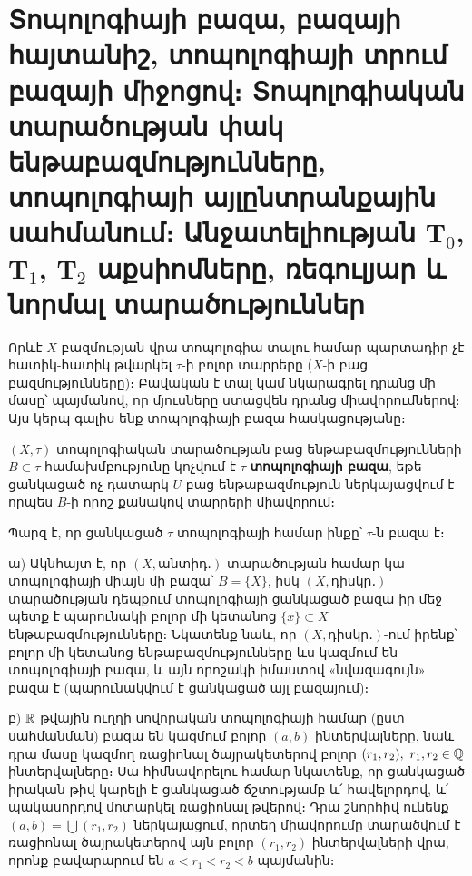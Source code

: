 \documentclass[./main.tex]{subfiles}
\begin{document}
\onehalfspacing
\section{Տոպո\-լոգիայի բազա, բազայի հայտանիշ, տոպո\-լո\-գիա\-յի տրում բազայի միջո\-ցով։ Տոպո\-լո\-գիա\-կան տարա\-ծու\-թյան փակ ենթա\-բազ\-մու\-թյուն\-ները, տոպո\-լո\-գիա\-յի այլ\-ընտ\-րան\-քա\-յին սահ\-մա\-նում։ Անջա\-տե\-լի\-ու\-թյան $\boldsymbol{\textrm{T}}_0$, $\boldsymbol{\textrm{T}}_1$, $\boldsymbol{\textrm{T}}_2$ աքսիոմ\-նե\-րը, ռեգուլ\-յար և նոր\-մալ տարա\-ծու\-թյուն\-ներ}\label{sec:5}

\par Որևէ $X$ բազմության վրա տոպո\-լոգիա տալու համար պարտադիր չէ հատիկ-հատիկ թվարկել $\tau$-ի բոլոր տարրերը ($X$-ի բաց բազմությունները)։ Բավական է տալ կամ նկարագրել դրանց մի մասը՝ պայմանով, որ մյուսները ստացվեն դրանց միավորումներով։ Այս կերպ գալիս ենք տոպո\-լոգիայի բազա հասկացությանը։
\begin{definition}
$(X, \tau)$ տոպո\-լոգիական տարածության բաց ենթաբազմությունների $B \subset \tau$ համախմբությունը կոչվում է $\tau$ \textbf{տոպո\-լոգիայի բազա}, եթե ցանկացած ոչ դատարկ ${U}$ բաց ենթաբազմություն ներկայացվում է որպես $B$-ի որոշ քանակով տարրերի միա\-վո\-րում։
\end{definition}
Պարզ է, որ ցանկացած $\tau$ տոպոլոգիայի համար ինքը՝ $\tau$-ն բազա է։
\begin{example}\label{ch5ex1} 
ա) Ակնհայտ է, որ $(X, \textrm{անտիդ․})$ տարածության համար կա տոպո\-լոգիայի միայն մի բազա՝ $B=\{X\}$, իսկ $(X, \textrm{դիսկր․})$ տարածության դեպքում տոպո\-լոգիայի ցանկացած բազա իր մեջ պետք է պարունակի բոլոր մի կե\-տա\-նոց ${\{x\} \subset X}$  ենթա\-բազմությունները։ Նկատենք նաև, որ $(X, \textrm{դիսկր․})$-ում իրենք՝ բոլոր մի կե\-տա\-նոց ենթաբազմությունները ևս կազմում են տոպո\-լոգիայի բազա, և այն որոշակի իմաս\-տով «նվազագույն» բազա է (պարունակվում է ցանկացած այլ բազայում)։
    
\par բ) $\mathbb{R}$ թվային ուղղի սովորական տոպո\-լոգիայի համար (ըստ սահմանման) բազա են կազմում բոլոր $(a,b)$ ինտերվալները, նաև դրա մասը կազմող ռացիոնալ \linebreak ծայրա\-կետերով բոլոր $(r_1, r_2),\ {r_1, r_2 \in \mathbb{Q}}$ ինտերվալները։ Սա հիմնավորելու հա\-մար նկա\-տենք, որ ցանկացած իրական թիվ կարելի է ցանկացած ճշտությամբ և՛ հա\-վե\-լոր\-դով, և՛ պակասորդով մոտարկել ռացիոնալ թվերով։ Դրա շնորհիվ ունենք  ${(a,b) =\bigcup{(r_1,r_2 )}}$ ներկայացում, որտեղ միավորումը տարածվում է ռացիոնալ \linebreak ծայրա\-կետերով այն բոլոր $(r_1, r_2)$ ին\-տեր\-վալ\-ների վրա, որոնք բավարարում են \linebreak ${a<r_1<r_2<b}$ պայմանին։
\end{example}
\end{document}
